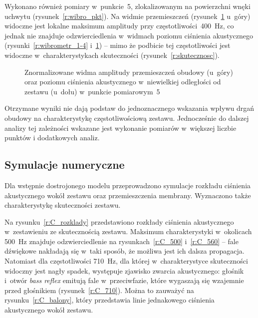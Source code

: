 \documentclass[12pt]{oska}
\begin{document}
	Wykonano również pomiary w~punkcie~\num{5}, zlokalizowanym na powierzchni wnęki uchwytu (rysunek~\ref{r:wibro_pkt}). Na widmie przemieszczeń (rysunek~\ref{r:wibrometr_5} u~góry) widoczne jest lokalne maksimum amplitudy przy częstotliwości~\SI{400}{\hertz}, co jednak nie znajduje odzwierciedlenia w~widmach poziomu ciśnienia akustycznego (rysunki~\ref{r:wibrometr_1-4} i~\ref{r:wibrometr_5}) -- mimo że podbicie tej częstotliwości jest widoczne w~charakterystykach skuteczności (rysunek~\ref{r:skutecznosc}).%
	
	\begin{figure}[!ht]
		\centering
		\caption{Znormalizowane widma amplitudy przemieszczeń obudowy (u~góry) oraz poziomu ciśnienia akustycznego w~niewielkiej odległości od zestawu (u~dołu) w~punkcie pomiarowym~\num{5}}
		\label{r:wibrometr_5}
	\end{figure}
	
	Otrzymane wyniki nie dają podstaw do jednoznacznego wskazania wpływu drgań obudowy na charakterystykę częstotliwościową zestawu. Jednocześnie do dalszej analizy tej zależności wskazane jest wykonanie pomiarów w~większej liczbie punktów i dodatkowych analiz.
	
	\subsection{Symulacje numeryczne}
	
	Dla wstępnie dostrojonego modelu przeprowadzono symulacje rozkładu ciśnienia akustycznego wokół zestawu oraz przemieszczenia membrany. Wyznaczono także charakterystykę skuteczności zestawu. 
	
	Na rysunku~\ref{r:C_rozklady} przedstawiono rozkłady ciśnienia akustycznego w~zestawieniu ze skutecznością zestawu. Maksimum charakterystyki w~okolicach \SI{500}{\hertz} znajduje odzwierciedlenie na rysunkach~\ref{r:C_500} i~\ref{r:C_560} -- fale dźwiękowe nakładają się w~taki sposób, że możliwa jest ich dalsza propagacja. Natomiast dla częstotliwości \SI{710}{\hertz}, dla której w~charakterystyce skuteczności widoczny jest nagły spadek, występuje zjawisko zwarcia akustycznego: głośnik i~otwór \textit{bass reflex} emitują fale w~przeciwfazie, które wygaszają się wzajemnie przed głośnikiem (rysunek~\ref{r:C_710}). Można to zauważyć na rysunku~\ref{r:C_balony}, który przedstawia linie jednakowego ciśnienia akustycznego wokół zestawu.
	
\end{document}
